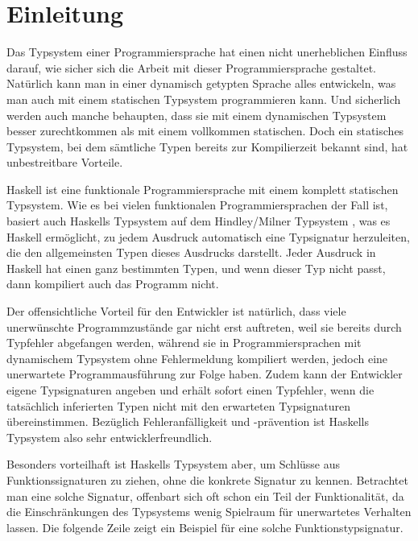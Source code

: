 \section{Einleitung}

\label{sec:einleitung}

Das Typsystem einer Programmiersprache hat einen nicht unerheblichen Einfluss darauf, wie sicher sich die Arbeit mit dieser
Programmiersprache gestaltet. Natürlich kann man in einer dynamisch getypten Sprache alles entwickeln, was man auch mit
einem statischen Typsystem programmieren kann. Und sicherlich werden auch manche behaupten, dass sie mit einem
dynamischen Typsystem besser zurechtkommen als mit einem vollkommen statischen. Doch ein statisches Typsystem,
bei dem sämtliche Typen bereits zur Kompilierzeit bekannt sind, hat unbestreitbare Vorteile.

Haskell ist eine funktionale Programmiersprache mit einem komplett statischen Typsystem. Wie es bei vielen funktionalen
Programmiersprachen der Fall ist, basiert auch Haskells Typsystem auf dem Hindley/Milner Typsystem \cite{wadler}, was es
Haskell ermöglicht, zu jedem Ausdruck automatisch eine Typsignatur herzuleiten, die den allgemeinsten Typen dieses Ausdrucks
darstellt. Jeder Ausdruck in Haskell hat einen ganz bestimmten Typen, und wenn dieser Typ nicht passt, dann kompiliert auch
das Programm nicht.

Der offensichtliche Vorteil für den Entwickler ist natürlich, dass viele unerwünschte Programmzustände gar nicht erst auftreten,
weil sie bereits durch Typfehler abgefangen werden, während sie in Programmiersprachen mit dynamischem Typsystem ohne
Fehlermeldung kompiliert werden, jedoch eine unerwartete Programmausführung zur Folge haben. Zudem kann der Entwickler
eigene Typsignaturen angeben und erhält sofort einen Typfehler, wenn die tatsächlich inferierten Typen nicht mit den
erwarteten Typsignaturen übereinstimmen.
Bezüglich Fehleranfälligkeit und -prävention ist Haskells Typsystem also sehr entwicklerfreundlich.

Besonders vorteilhaft ist Haskells Typsystem aber, um Schlüsse aus Funktionssignaturen zu ziehen, ohne die konkrete
Signatur zu kennen. Betrachtet man eine solche Signatur, offenbart sich oft schon ein Teil der Funktionalität, da die
Einschränkungen des Typsystems wenig Spielraum für unerwartetes Verhalten lassen. Die folgende Zeile zeigt ein Beispiel
für eine solche Funktionstypsignatur.
%

